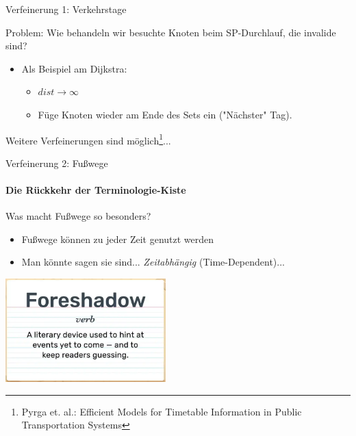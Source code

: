 \begin{frame}{Verfeinerung 1: Verkehrstage}
	\begin{block}{}
		Problem: Wie behandeln wir besuchte Knoten beim SP-Durchlauf, die invalide sind?
	\end{block}

	\pause
	\begin{itemize}
		\item Als Beispiel am Dijkstra: 
		\begin{itemize}
			\item $dist \rightarrow \infty$
			\item Füge Knoten wieder am Ende des Sets ein ("{}Nächster"{} Tag).
		\end{itemize}
	\end{itemize}
	\vspace{5em}
	Weitere Verfeinerungen sind möglich\footnote{Pyrga et. al.: Efficient Models for Timetable Information in Public Transportation Systems}...
\end{frame}


\begin{frame}{Verfeinerung 2: Fußwege}
	\framesubtitle{Die Rückkehr der Terminologie-Kiste}
	\begin{block}{}
		Was macht Fußwege so besonders?
	\end{block}
	\begin{itemize}
		\item Fußwege können zu jeder Zeit genutzt werden
		\item Man könnte sagen sie sind... \textit{Zeitabhängig} (Time-Dependent)...
	\end{itemize}

	\begin{center}
		\includegraphics[height=4cm]{images/foreshadowing.png} 
	\end{center}
\end{frame}


